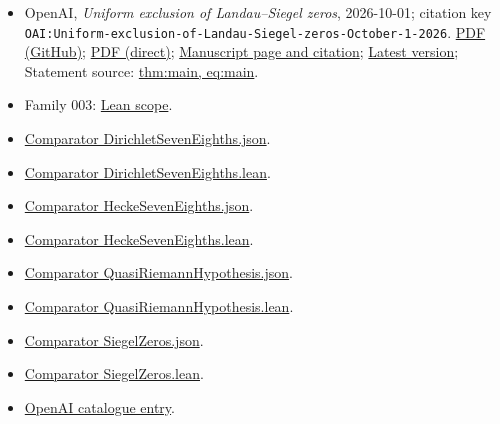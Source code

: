 \documentclass[11pt]{article}
\begin{document}
\begin{itemize}
\item OpenAI, \emph{Uniform exclusion of Landau–Siegel zeros}, 2026-10-01; citation key \texttt{OAI:Uniform-exclusion-of-Landau-Siegel-zeros-October-1-2026}. \href{https://github.com/openai/math/blob/adc7f1241b42e322a6451854ab7e4b4c146bf78a/preprints/Uniform-exclusion-of-Landau-Siegel-zeros-October-1-2026/paper.pdf}{PDF (GitHub)}; \href{https://github.com/openai/math/raw/adc7f1241b42e322a6451854ab7e4b4c146bf78a/preprints/Uniform-exclusion-of-Landau-Siegel-zeros-October-1-2026/paper.pdf}{PDF (direct)}; \href{https://github.com/openai/math/blob/adc7f1241b42e322a6451854ab7e4b4c146bf78a/preprints/Uniform-exclusion-of-Landau-Siegel-zeros-October-1-2026/README.md}{Manuscript page and citation}; \href{https://github.com/openai/math/blob/main/preprints/Uniform-exclusion-of-Landau-Siegel-zeros-October-1-2026/paper.pdf}{Latest version}; Statement source: \href{https://github.com/openai/math/blob/adc7f1241b42e322a6451854ab7e4b4c146bf78a/preprints/Uniform-exclusion-of-Landau-Siegel-zeros-October-1-2026/build/paper.tex\#L66}{thm:main, eq:main}.
\item Family 003: \href{https://github.com/openai/math/blob/adc7f1241b42e322a6451854ab7e4b4c146bf78a/lean/docs/003.md}{Lean scope}.
\item \href{https://github.com/openai/math/blob/adc7f1241b42e322a6451854ab7e4b4c146bf78a/lean/ComparatorChallenges/DirichletSevenEighths.json}{Comparator DirichletSevenEighths.json}.
\item \href{https://github.com/openai/math/blob/adc7f1241b42e322a6451854ab7e4b4c146bf78a/lean/ComparatorChallenges/DirichletSevenEighths.lean}{Comparator DirichletSevenEighths.lean}.
\item \href{https://github.com/openai/math/blob/adc7f1241b42e322a6451854ab7e4b4c146bf78a/lean/ComparatorChallenges/HeckeSevenEighths.json}{Comparator HeckeSevenEighths.json}.
\item \href{https://github.com/openai/math/blob/adc7f1241b42e322a6451854ab7e4b4c146bf78a/lean/ComparatorChallenges/HeckeSevenEighths.lean}{Comparator HeckeSevenEighths.lean}.
\item \href{https://github.com/openai/math/blob/adc7f1241b42e322a6451854ab7e4b4c146bf78a/lean/ComparatorChallenges/QuasiRiemannHypothesis.json}{Comparator QuasiRiemannHypothesis.json}.
\item \href{https://github.com/openai/math/blob/adc7f1241b42e322a6451854ab7e4b4c146bf78a/lean/ComparatorChallenges/QuasiRiemannHypothesis.lean}{Comparator QuasiRiemannHypothesis.lean}.
\item \href{https://github.com/openai/math/blob/adc7f1241b42e322a6451854ab7e4b4c146bf78a/lean/ComparatorChallenges/SiegelZeros.json}{Comparator SiegelZeros.json}.
\item \href{https://github.com/openai/math/blob/adc7f1241b42e322a6451854ab7e4b4c146bf78a/lean/ComparatorChallenges/SiegelZeros.lean}{Comparator SiegelZeros.lean}.
\item \href{https://github.com/openai/math/blob/adc7f1241b42e322a6451854ab7e4b4c146bf78a/CONTENTS.md}{OpenAI catalogue entry}.
\end{itemize}
\end{document}
